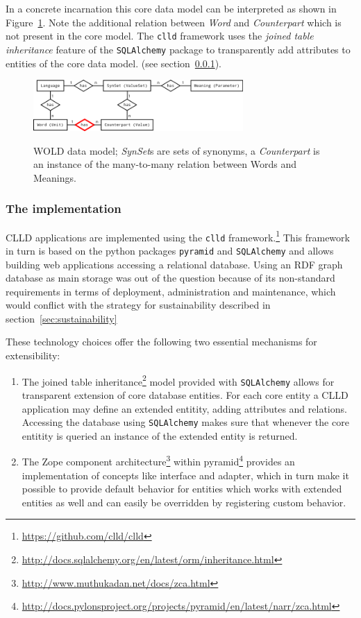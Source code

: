 \documentclass[a4paper,10pt]{article}
\begin{document}
In a concrete incarnation this core data model can be interpreted as shown in Figure~\ref{wolddatamodel}.
Note the additional relation between \emph{Word} and \emph{Counterpart} which is not present in the core model.
The \texttt{clld} framework uses the \emph{joined table inheritance} feature of the \texttt{SQLAlchemy} package
to transparently add attributes to entities of the core data model. 
(see section~\ref{sec:implementation}).


\begin{figure}[h!]
  \caption{WOLD data model; \textit{SynSet}s are sets of synonyms, a \textit{Counterpart}
  is an instance of the many-to-many relation between Words and Meanings.}
  \centering
\includegraphics[width=8cm]{wold_erd.png}
\label{wolddatamodel}
\end{figure}


\subsubsection{The implementation}
\label{sec:implementation}
CLLD applications are implemented using the \texttt{clld} framework.\footnote{\url{https://github.com/clld/clld}}
This framework in turn is based on the python packages \texttt{pyramid} and \texttt{SQLAlchemy} and allows building web applications accessing a relational database.
Using an RDF graph database as main storage was out of the question because of its non-standard requirements
in terms of deployment, administration and maintenance, which would conflict with the strategy for sustainability described in section~\ref{sec:sustainability}

These technology choices offer the following two essential mechanisms for extensibility:
\begin{enumerate}
\item The joined table inheritance\footnote{\url{http://docs.sqlalchemy.org/en/latest/orm/inheritance.html}} model provided with \texttt{SQLAlchemy} allows for transparent extension of core database entities. For each core entity
a CLLD application may define an extended entitity, adding attributes and relations. Accessing the database using \texttt{SQLAlchemy} makes sure
that whenever the core entitity is queried an instance of the extended entity is returned.
\item The Zope component architecture\footnote{\url{http://www.muthukadan.net/docs/zca.html}} within pyramid\footnote{\url{http://docs.pylonsproject.org/projects/pyramid/en/latest/narr/zca.html}} provides an implementation of concepts like interface and adapter, which in turn make it possible to provide
default behavior for entities which works with extended entities as well and can easily be overridden by registering custom behavior.
\end{enumerate}
\end{document}
